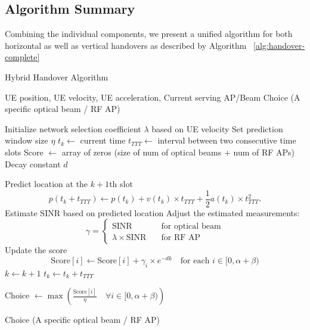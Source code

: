 \subsection{Algorithm Summary}
Combining the individual components, we present a unified algorithm for both horizontal as well as vertical handovers as described by Algorithm ~\ref{alg:handover-complete}
\begin{algorithm}
\caption{Hybrid Handover Algorithm}
\label{alg:handover-complete}
\begin{algorithmic}[1]
\REQUIRE UE position, UE velocity, UE acceleration, Current serving AP/Beam
\ENSURE Choice (A specific optical beam / RF AP)

\STATE Initialize network selection coefficient $\lambda$ based on UE velocity
\STATE Set prediction window size $\eta$
\STATE $t_k \leftarrow$ current time
\STATE $t_{TTT} \leftarrow$ interval between two consecutive time slots
\STATE Score $\leftarrow$ array of zeros (size of num of optical beams + num of RF APs)
\STATE Decay constant $d$

    \STATE Predict location at the $k+1$th slot
    \[
    p(t_k + t_{TTT}) \leftarrow p(t_k) + v(t_k) \times t_{TTT} + \frac{1}{2}a(t_k) \times t_{TTT}^2.
    \]
    \STATE Estimate SINR based on predicted location
    \STATE Adjust the estimated measurements:
    \[
    \gamma = 
    \begin{cases} 
    \text{SINR} \quad &\text{for optical beam} \\
    \lambda \times \text{SINR} \quad &\text{for RF AP}
    \end{cases}
    \]
    \STATE Update the score 
    \[
    \text{Score}[i] \leftarrow \text{Score}[i] + \gamma_i \times e^{-dk} \quad \text{for each } i \in [0, \alpha + \beta)
    \]
    \STATE $k \leftarrow k + 1$
    \STATE $t_k \leftarrow t_k + t_{TTT}$
\ENDWHILE

\STATE Choice $\leftarrow \max\left(\frac{\text{Score}[i]}{\eta} \quad \forall i \in [0, \alpha + \beta)\right)$

\RETURN Choice (A specific optical beam / RF AP)
\end{algorithmic}
\end{algorithm}


